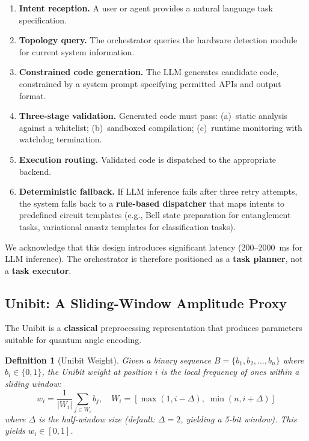﻿\documentclass[12pt,a4paper]{article}
\newtheorem{definition}{Definition}[section]
\begin{document}
\begin{enumerate}[leftmargin=2em]
    \item \textbf{Intent reception.} A user or agent provides a natural language task specification.
    \item \textbf{Topology query.} The orchestrator queries the hardware detection module for current system information.
    \item \textbf{Constrained code generation.} The LLM generates candidate code, constrained by a system prompt specifying permitted APIs and output format.
    \item \textbf{Three-stage validation.} Generated code must pass: (a)~static analysis against a whitelist; (b)~sandboxed compilation; (c)~runtime monitoring with watchdog termination.
    \item \textbf{Execution routing.} Validated code is dispatched to the appropriate backend.
    \item \textbf{Deterministic fallback.} If LLM inference fails after three retry attempts, the system falls back to a \textbf{rule-based dispatcher} that maps intents to predefined circuit templates (e.g., Bell state preparation for entanglement tasks, variational ansatz templates for classification tasks).
\end{enumerate}

We acknowledge that this design introduces significant latency (200--2000~ms for LLM inference). The orchestrator is therefore positioned as a \textbf{task planner}, not a \textbf{task executor}.

\subsection{Unibit: A Sliding-Window Amplitude Proxy}\label{sec:unibit}

The Unibit is a \textbf{classical} preprocessing representation that produces parameters suitable for quantum angle encoding.

\begin{definition}[Unibit Weight]
Given a binary sequence $B = \{b_1, b_2, \dots, b_n\}$ where $b_i \in \{0, 1\}$, the Unibit weight at position $i$ is the local frequency of ones within a sliding window:
\begin{equation}
    w_i = \frac{1}{|W_i|} \sum_{j \in W_i} b_j, \quad W_i = [\max(1, i - \Delta),\; \min(n, i + \Delta)]
\end{equation}
where $\Delta$ is the half-window size (default: $\Delta = 2$, yielding a 5-bit window). This yields $w_i \in [0, 1]$.
\end{definition}
\end{document}
